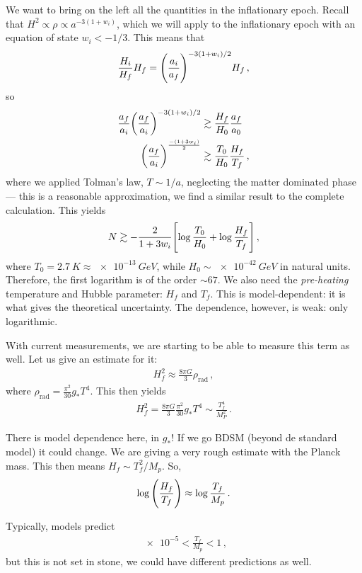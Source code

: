 \documentclass[main.tex]{subfiles}
\begin{document}
We want to bring on the left all the quantities in the inflationary epoch. 
Recall that \(H^2 \propto \rho \propto a^{-3 (1+ w_i)}\), which we will apply to the inflationary epoch with an equation of state \(w_i < - 1/3\). This means that 
%
\begin{align}
\frac{H_i}{H_f} H_f = \qty(\frac{a_i}{a_f})^{-3(1+ w_i) / 2} H_f
\,,
\end{align}
%
so 
%
\begin{align}
\frac{a_f}{a_i} \qty(\frac{a_f}{a_i})^{- 3 (1+ w_i) / 2} &\gtrsim  
\frac{H_f}{H_0} \frac{a_f}{a_0 } \\
\qty(\frac{a_f}{a_i})^{\frac{-(1 + 3 w_i)}{2}}
&\gtrsim \frac{T_0 }{H_0 } \frac{H_f}{T_f}
\,,
\end{align}
%
where we applied Tolman's law, \(T \sim 1/a\), neglecting the matter dominated phase --- this is a reasonable approximation, we find a similar result to the complete calculation. This yields 
%
\begin{align}
N \gtrsim - \frac{2}{1 + 3 w _i} \qty[ \log \frac{T_0 }{H_0 } + \log \frac{H_f}{T_f}]
\,,
\end{align}
%
where \(T_0 = \SI{2.7}{K} \approx \SI{e-13}{GeV}\), while \(H_0 \sim \SI{e-42}{GeV}\) in natural units. Therefore, the first logarithm is of the order \(\sim 67\). 
We also need the \emph{pre-heating} temperature and Hubble parameter: \(H_f\) and \(T_f\). 
This is model-dependent: it is what gives the theoretical uncertainty. 
The dependence, however, is weak: only logarithmic. 

With current measurements, we are starting to be able to measure this term as well. 
Let us give an estimate for it: 
%
\begin{align}
H_f^2 \approx \frac{8 \pi G}{3} \rho _{\text{rad}}
\,,
\end{align}
%
where \(\rho _{\text{rad}} = \frac{\pi^2}{30} g_* T^{4}\). This then yields 
%
\begin{align}
H^2_f = \frac{8 \pi G}{3} \frac{\pi^2}{30} g_* T^{4} \sim \frac{T_f^4}{M_P^2}
\,.
\end{align}

There is model dependence here, in \(g_*\)! If we go BDSM (beyond de standard model) it could change. 
We are giving a very rough estimate with the Planck mass. This then means \(H_f \sim T_f^2 / M_p\). So, 
%
\begin{align}
\log \qty( \frac{H_f}{T_f}) \approx \log \frac{T_f}{M_p}
\,.
\end{align}

Typically, models predict 
%
\begin{align}
\num{e-5} < \frac{T_f}{M_p} < 1
\,,
\end{align}
%
but this is not set in stone, we could have different predictions as well. 
\end{document}

